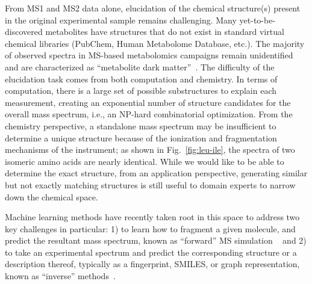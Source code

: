 \documentclass{article}
\theoremstyle{plain}
\theoremstyle{definition}
\theoremstyle{remark}
\begin{document}

From MS1 and MS2 data alone, elucidation of the chemical structure(s) present in the original experimental sample remains %
challenging. Many yet-to-be-discovered metabolites have structures that do not exist in standard virtual chemical libraries (PubChem, Human Metabolome Database, etc.). The majority of observed spectra in MS-based metabolomics campaigns remain unidentified and are characterized as ``metabolite dark matter''~\citep{bittremieux2022critical}. The difficulty of the elucidation task comes from both computation and chemistry. In terms of computation, there is a large set of possible substructures to explain each measurement, creating an exponential number of structure candidates for the overall mass spectrum, i.e., an NP-hard combinatorial optimization. From the chemistry perspective, a standalone mass spectrum may be insufficient to determine a unique structure because of the ionization and fragmentation mechanisms of the instrument; as shown in Fig.~\ref{fig:leu-ile}, the spectra of two isomeric amino acids are nearly identical. While we would like to be able to determine the exact structure, from an application perspective, generating similar but not exactly matching structures is still useful to domain experts to narrow down the chemical space. 


Machine learning methods have recently taken root in this space to address two key challenges in particular: 1) to learn how to fragment a given molecule, and predict the resultant mass spectrum, known as ``forward'' MS simulation ~\citep{murphy2023efficiently,goldman2023scarf,goldman2024iceberg,young2024fragnnet,young2024massformer,nowatzky2024fiora} and 2) to take an experimental spectrum and predict the corresponding structure or a description thereof, typically as a fingerprint, SMILES, or graph representation, known as ``inverse'' methods~\citep{duhrkop2015csifingerid,stravs2022msnovelist, butler2023ms2mol,litsa2023spec2mol,goldman2023mist}. %
\end{document}
